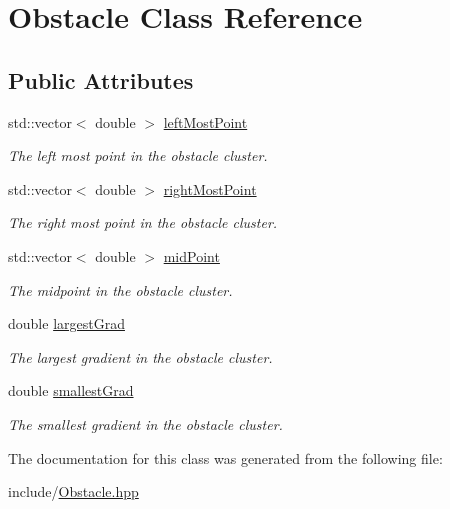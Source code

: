 \hypertarget{classObstacle}{}\section{Obstacle Class Reference}
\label{classObstacle}
\subsection*{Public Attributes}
\begin{DoxyCompactItemize}
\item 
std\+::vector$<$ double $>$ \hyperlink{classObstacle_a50648250ad46b7c02858dd34ad705b82}{left\+Most\+Point}\hypertarget{classObstacle_a50648250ad46b7c02858dd34ad705b82}{}\label{classObstacle_a50648250ad46b7c02858dd34ad705b82}

\begin{DoxyCompactList}\small\item\em The left most point in the obstacle cluster. \end{DoxyCompactList}\item 
std\+::vector$<$ double $>$ \hyperlink{classObstacle_a98d92d6458a8bd9c974b0d4eb0a23f6a}{right\+Most\+Point}\hypertarget{classObstacle_a98d92d6458a8bd9c974b0d4eb0a23f6a}{}\label{classObstacle_a98d92d6458a8bd9c974b0d4eb0a23f6a}

\begin{DoxyCompactList}\small\item\em The right most point in the obstacle cluster. \end{DoxyCompactList}\item 
std\+::vector$<$ double $>$ \hyperlink{classObstacle_a19b8541b4cb1afdd6041a6cbffc12fb4}{mid\+Point}\hypertarget{classObstacle_a19b8541b4cb1afdd6041a6cbffc12fb4}{}\label{classObstacle_a19b8541b4cb1afdd6041a6cbffc12fb4}

\begin{DoxyCompactList}\small\item\em The midpoint in the obstacle cluster. \end{DoxyCompactList}\item 
double \hyperlink{classObstacle_a72ad3fd5d33750946ffcd5497ad96449}{largest\+Grad}\hypertarget{classObstacle_a72ad3fd5d33750946ffcd5497ad96449}{}\label{classObstacle_a72ad3fd5d33750946ffcd5497ad96449}

\begin{DoxyCompactList}\small\item\em The largest gradient in the obstacle cluster. \end{DoxyCompactList}\item 
double \hyperlink{classObstacle_a8be12479fb083dec515e4405fd1853b1}{smallest\+Grad}\hypertarget{classObstacle_a8be12479fb083dec515e4405fd1853b1}{}\label{classObstacle_a8be12479fb083dec515e4405fd1853b1}

\begin{DoxyCompactList}\small\item\em The smallest gradient in the obstacle cluster. \end{DoxyCompactList}\end{DoxyCompactItemize}


The documentation for this class was generated from the following file\+:\begin{DoxyCompactItemize}
\item 
include/\hyperlink{Obstacle_8hpp}{Obstacle.\+hpp}\end{DoxyCompactItemize}
